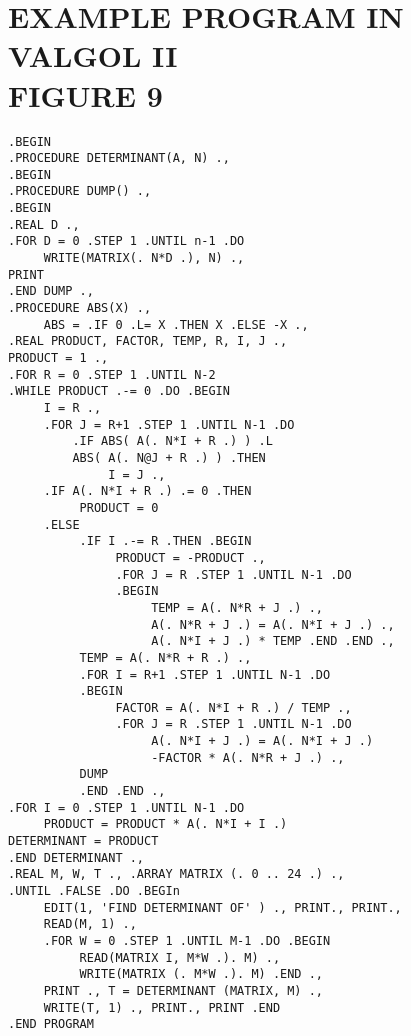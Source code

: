 \documentclass[twocolumn]{article}
\begin{document}
\section{EXAMPLE PROGRAM IN VALGOL II\\FIGURE 9}
\begin{verbatim}
.BEGIN
.PROCEDURE DETERMINANT(A, N) .,
.BEGIN
.PROCEDURE DUMP() .,
.BEGIN
.REAL D .,
.FOR D = 0 .STEP 1 .UNTIL n-1 .DO
     WRITE(MATRIX(. N*D .), N) .,
PRINT
.END DUMP .,
.PROCEDURE ABS(X) .,
     ABS = .IF 0 .L= X .THEN X .ELSE -X .,
.REAL PRODUCT, FACTOR, TEMP, R, I, J .,
PRODUCT = 1 .,
.FOR R = 0 .STEP 1 .UNTIL N-2
.WHILE PRODUCT .-= 0 .DO .BEGIN
     I = R .,
     .FOR J = R+1 .STEP 1 .UNTIL N-1 .DO
         .IF ABS( A(. N*I + R .) ) .L
         ABS( A(. N@J + R .) ) .THEN
              I = J .,
     .IF A(. N*I + R .) .= 0 .THEN
          PRODUCT = 0
     .ELSE
          .IF I .-= R .THEN .BEGIN
               PRODUCT = -PRODUCT .,
               .FOR J = R .STEP 1 .UNTIL N-1 .DO
               .BEGIN
                    TEMP = A(. N*R + J .) .,
                    A(. N*R + J .) = A(. N*I + J .) .,
                    A(. N*I + J .) * TEMP .END .END .,
          TEMP = A(. N*R + R .) .,
          .FOR I = R+1 .STEP 1 .UNTIL N-1 .DO
          .BEGIN
               FACTOR = A(. N*I + R .) / TEMP .,
               .FOR J = R .STEP 1 .UNTIL N-1 .DO
                    A(. N*I + J .) = A(. N*I + J .)
                    -FACTOR * A(. N*R + J .) .,
          DUMP
          .END .END .,
.FOR I = 0 .STEP 1 .UNTIL N-1 .DO
     PRODUCT = PRODUCT * A(. N*I + I .)
DETERMINANT = PRODUCT
.END DETERMINANT .,
.REAL M, W, T ., .ARRAY MATRIX (. 0 .. 24 .) .,
.UNTIL .FALSE .DO .BEGIn
     EDIT(1, 'FIND DETERMINANT OF' ) ., PRINT., PRINT.,
     READ(M, 1) .,
     .FOR W = 0 .STEP 1 .UNTIL M-1 .DO .BEGIN
          READ(MATRIX I, M*W .). M) .,
          WRITE(MATRIX (. M*W .). M) .END .,
     PRINT ., T = DETERMINANT (MATRIX, M) .,
     WRITE(T, 1) ., PRINT., PRINT .END
.END PROGRAM
\end{verbatim}
\end{document}
